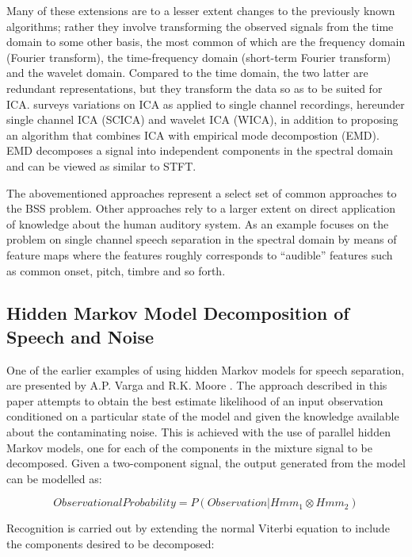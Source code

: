 \documentclass[11pt, oneside, a4paper]{report}
\begin{document}
Many of these extensions are to a lesser extent changes to the
previously known algorithms; rather they involve transforming
the observed signals from the time domain to some other basis, the
most common of which are the frequency domain (Fourier transform), the
time-frequency domain (short-term Fourier transform) and the wavelet
domain. Compared to the time domain, the two latter are redundant
representations, but they transform the data so as to be suited for
ICA. \cite{mijovic2010} surveys variations on ICA as applied to single
channel recordings, hereunder single channel ICA (SCICA) and wavelet
ICA (WICA), in addition to proposing an algorithm that combines ICA
with empirical mode decompostion (EMD). EMD decomposes a signal into
independent components in the spectral domain and can be viewed as
similar to STFT.

The abovementioned approaches represent a select set of common
approaches to the  BSS problem. Other approaches rely to a larger
extent on direct application of knowledge about the human auditory
system. As an example \cite{bach} focuses on the problem on single channel speech
separation in the spectral domain by means of feature
maps where the features roughly corresponds to ``audible'' features such
as common onset, pitch, timbre and so forth. 


\subsection{Hidden Markov Model Decomposition of Speech and Noise}
One of the earlier examples of using hidden Markov models for speech separation, are presented by A.P. Varga and R.K. Moore \cite{VargaHMMDecomp}. 
The approach described in this paper attempts to obtain the best estimate likelihood of an input observation conditioned on a particular state of the model and given the knowledge available about the contaminating noise. This is achieved with the use of parallel hidden Markov models, one for each of the components in the mixture signal to be decomposed. Given a two-component signal, the output generated from the model can be modelled as:

\begin{equation}\label{vargasEqn1}
Observational Probability = P(Observation|Hmm_1 \otimes Hmm_2)
\end{equation}

Recognition is carried out by extending the normal Viterbi equation to include the components desired to be decomposed:
\end{document}
